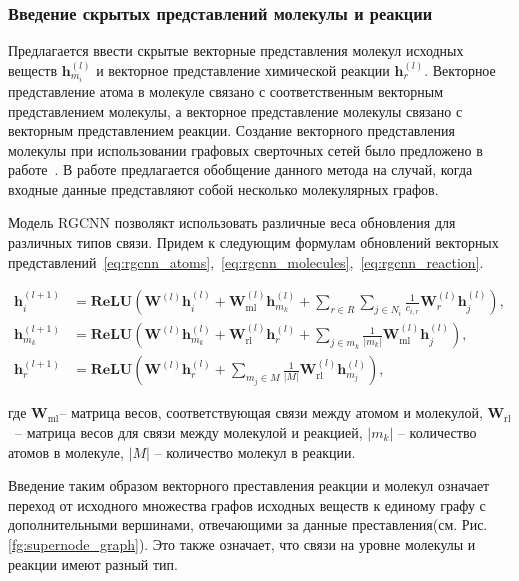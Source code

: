 \documentclass[12pt, twoside]{article}
\begin{document}
\subsubsection{Введение скрытых представлений молекулы и реакции}

Предлагается ввести скрытые векторные представления молекул исходных веществ $\mathbf{h}_{m_i}^{(l)}$ и векторное представление химической реакции $\mathbf{h}_r^{(l)}$. Векторное представление атома в молекуле связано с соответственным векторным представлением молекулы, а векторное представление молекулы связано с векторным представлением реакции. Создание векторного представления молекулы при использовании графовых сверточных сетей было предложено в работе~\cite{li2017learning}. В работе предлагается обобщение данного метода на случай, когда входные данные представляют собой несколько молекулярных графов. 


Модель RGCNN позволякт использовать различные веса обновления для различных типов связи. Придем к следующим формулам обновлений векторных представлений~\eqref{eq:rgcnn_atoms},~\eqref{eq:rgcnn_molecules},~\eqref{eq:rgcnn_reaction}.

\begin{align}
    \label{eq:rgcnn_atoms}
    \mathbf{h}^{(l+1)}_i & = \mathbf{\text{ReLU}} \left(\mathbf{W}^{(l)}\mathbf{h}^{(l)}_i + \mathbf{W}^{(l)}_{\text{ml}}\mathbf{h}^{(l)}_{m_k} + \sum \limits_{r \in R}\sum \limits_{j \in N_i} \frac{1}{c_{i, r}} \mathbf{W}^{(l)}_r \mathbf{h}^{(l)}_j \right),\\
    \label{eq:rgcnn_molecules}
    \mathbf{h}^{(l+1)}_{m_k} & = \mathbf{\text{ReLU}} \left(\mathbf{W}^{(l)}\mathbf{h}^{(l)}_{m_k} + \mathbf{W}^{(l)}_{\text{rl}}\mathbf{h}^{(l)}_r + \sum \limits_{j \in m_k} \frac{1}{|m_k|} \mathbf{W}^{(l)}_{\text{ml}} \mathbf{h}^{(l)}_j \right),\\
    \label{eq:rgcnn_reaction}
    \mathbf{h}^{(l+1)}_{r} & = \mathbf{\text{ReLU}} \left(\mathbf{W}^{(l)}\mathbf{h}^{(l)}_{r} + \sum \limits_{m_j \in M} \frac{1}{|M|} \mathbf{W}^{(l)}_{\text{rl}}\mathbf{h}^{(l)}_{m_j} \right),
\end{align}

где $\mathbf{W}_{\text{ml}}$-- матрица весов, соответствующая связи между атомом и молекулой, $\mathbf{W}_{\text{rl}}$ ~-- матрица весов для связи между молекулой и реакцией, $|m_k|$ -- количество атомов в молекуле, $|M|$ -- количество молекул в реакции.

Введение таким образом векторного преставления реакции и молекул означает переход от исходного множества графов исходных веществ к единому графу с дополнительными вершинами, отвечающими за данные преставления(см. Рис. \ref{fg:supernode_graph}). Это также означает, что связи на уровне молекулы и реакции имеют разный тип.
\end{document}
